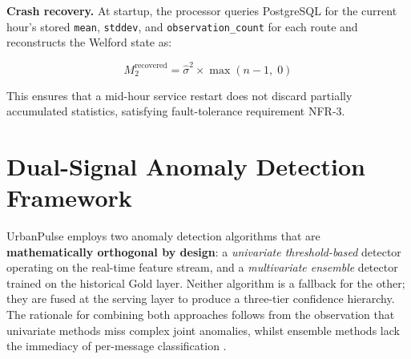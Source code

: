                                                                                                                                                           
  \textbf{Crash recovery.} At startup, the processor queries PostgreSQL                                                                                   
  for the current hour's stored \texttt{mean}, \texttt{stddev},
  and \texttt{observation\_count} for each route and reconstructs                                                                                         
  the Welford state as:
                                                                                                                                                          
  \begin{equation}
  \label{eq:welford_recovery}                                                                                                                             
  M_2^{\text{recovered}} = \hat{\sigma}^2 \times \max(n - 1,\; 0)
  \end{equation}                                                                                                                                          
   
  This ensures that a mid-hour service restart does not discard partially                                                                                 
  accumulated statistics, satisfying fault-tolerance requirement NFR-3.
                                                                                                                                                          
  \section{Dual-Signal Anomaly Detection Framework}                                                                                                       
  \label{sec:anomaly}                                                                                                                                     
                                                                                                                                                          
  UrbanPulse employs two anomaly detection algorithms that are
  \textbf{mathematically orthogonal by design}: a \textit{univariate
  threshold-based} detector operating on the real-time feature stream,
  and a \textit{multivariate ensemble} detector trained on the historical
  Gold layer. Neither algorithm is a fallback for the other; they are
  fused at the serving layer to produce a three-tier confidence hierarchy.
  The rationale for combining both approaches follows from the observation
  that univariate methods miss complex joint anomalies, whilst ensemble
  methods lack the immediacy of per-message classification
  \cite{chandola2009anomaly}.

